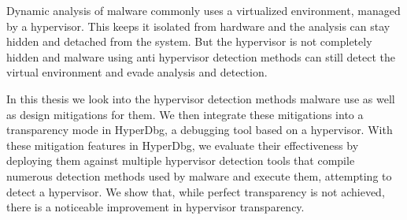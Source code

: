 Dynamic analysis of malware commonly uses a virtualized environment, managed by a hypervisor.
This keeps it isolated from hardware and the analysis can stay hidden and detached from the system. But the hypervisor is not completely hidden and malware using anti hypervisor 
detection methods can still detect the virtual environment and evade analysis and detection. 

In this thesis we look into the hypervisor detection methods malware use as well as design mitigations for them.  
We then integrate these mitigations into a transparency mode in HyperDbg, a debugging tool based on a hypervisor. With these mitigation features in HyperDbg, 
we evaluate their effectiveness by deploying them against multiple hypervisor detection tools that compile numerous detection methods used by malware and execute them, 
attempting to detect a hypervisor. We show that, while perfect transparency is not achieved, there is a noticeable improvement in hypervisor transparency.




